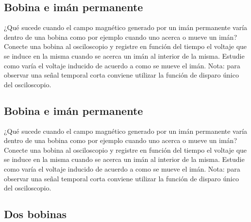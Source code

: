 \documentclass[epj]{svjour}
\begin{document}
\subsection{Bobina e imán permanente}
¿Qué sucede cuando el campo magnético generado por un imán permanente varía dentro de
una bobina como por ejemplo cuando uno acerca o mueve un imán? Conecte una bobina al
osciloscopio y registre en función del tiempo el voltaje que se induce en la misma cuando se acerca
un imán al interior de la misma. Estudie como varía el voltaje inducido de acuerdo a como se
mueve el imán. Nota: para observar una señal temporal corta conviene utilizar la función de disparo
único del osciloscopio.
\subsection{Bobina e imán permanente}
¿Qué sucede cuando el campo magnético generado por un imán permanente varía dentro de
una bobina como por ejemplo cuando uno acerca o mueve un imán? Conecte una bobina al
osciloscopio y registre en función del tiempo el voltaje que se induce en la misma cuando se acerca
un imán al interior de la misma. Estudie como varía el voltaje inducido de acuerdo a como se
mueve el imán. Nota: para observar una señal temporal corta conviene utilizar la función de disparo
único del osciloscopio.



\subsection{Dos bobinas}
\end{document}
